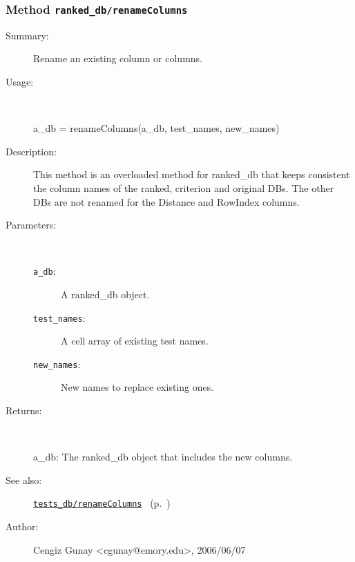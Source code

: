 \subsubsection[Method \texttt{renameColumns}]{Method \texttt{ranked\_db/renameColumns}}%
%
\label{ref_ranked_db__renameColumns}%
\hypertarget{ref_ranked_db__renameColumns}{}%
\begin{description}
\item[Summary:]Rename an existing column or columns.
%
\item[Usage:]~%
\begin{lyxcode}%
a\_db = renameColumns(a\_db, test\_names, new\_names)
%
\end{lyxcode}%
%
\item[Description:]%
This method is an overloaded method for ranked\_db that keeps consistent
 the column names of the ranked, criterion and original DBs. The other
 DBs are not renamed for the Distance and RowIndex columns.
\item[Parameters:]~
\begin{description}%
\item[\texttt{a\_db}:]
 A ranked\_db object.
\item[\texttt{test\_names}:]
 A cell array of existing test names.
\item[\texttt{new\_names}:]
 New names to replace existing ones.
\end{description}%
%
\item[Returns:]~

	a\_db: The ranked\_db object that includes the new columns.
%
%
\item[See also:]%
\hyperlink{ref_tests_db__renameColumns}{\texttt{tests\_db/renameColumns}}%
\ (p.~\pageref{ref_tests_db__renameColumns})%
%
%
\item[Author:]%
Cengiz Gunay <cgunay@emory.edu>, 2006/06/07%
\end{description}
\methodline%
